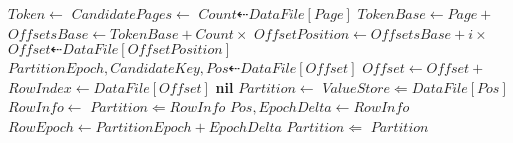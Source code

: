 \documentclass[fleqn]{article}
\begin{document}
\begin{algorithm}
\begin{algorithmic}[1]
\State $Token \gets $ 
\State $CandidatePages \gets $
 \State $Count \dashleftarrow DataFile[Page]$
 \State $TokenBase \gets Page +  $ 
 \State $OffsetsBase \gets TokenBase + Count \times $
 \For{$i \gets $ \Call{Find}{$DataFile[TokenBase \dots OffsetBase), Token$}}
  \State $OffsetPosition \gets OffsetsBase + i \times $ 
  \State $Offset \dashleftarrow DataFile[OffsetPosition]$
  \State $PartitionEpoch, CandidateKey, Pos \dashleftarrow DataFile[Offset]$
   \State $Offset \gets Offset + $ 
   \State $RowIndex \gets DataFile[Offset]$
   \State \Return {}
  \EndIf
 \EndFor
\EndFor
\Return \textbf{nil}
\EndFunction
\Statex
{}
\State $Partition \gets $ 
\State $ValueStore \Leftarrow DataFile[Pos]$
 \State $RowInfo \gets$ 
  \State $Partition \Leftarrow RowInfo$
 \Else
  \State $Pos, EpochDelta \gets RowInfo$
  \State $RowEpoch \gets PartitionEpoch + EpochDelta$
  \State $Partition \Leftarrow $ 
 \EndIf
\EndFor
\Return $Partition$
\EndFunction
\end{algorithmic}
\end{algorithm}

\clearpage
\end{document}
